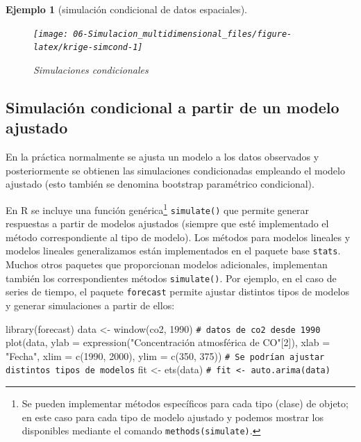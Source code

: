 \documentclass[
]{book}
\newenvironment{Shaded}{\begin{snugshade}}{\end{snugshade}}
\newcommand{\AttributeTok}[1]{\textcolor[rgb]{0.77,0.63,0.00}{#1}}
\newcommand{\CommentTok}[1]{\textcolor[rgb]{0.56,0.35,0.01}{\textit{#1}}}
\newcommand{\DecValTok}[1]{\textcolor[rgb]{0.00,0.00,0.81}{#1}}
\newcommand{\FunctionTok}[1]{\textcolor[rgb]{0.00,0.00,0.00}{#1}}
\newcommand{\NormalTok}[1]{#1}
\newcommand{\OtherTok}[1]{\textcolor[rgb]{0.56,0.35,0.01}{#1}}
\newcommand{\StringTok}[1]{\textcolor[rgb]{0.31,0.60,0.02}{#1}}
\theoremstyle{break}
\newtheorem{example}{Ejemplo}[chapter]
\theoremstyle{nonumberplain}
\renewcommand{\CommentTok}[1]{\textcolor[rgb]{0.41,0.41,0.41}{\texttt{#1}}}
\begin{document}
\begin{example}[simulación condicional de datos espaciales]
\begin{figure}[!htb]

{\centering \texttt{[image: 06-Simulacion\_multidimensional\_files/figure-latex/krige-simcond-1]} 

}

\caption{Simulaciones condicionales}\label{fig:krige-simcond}
\end{figure}

\end{example}

\hypertarget{simulaciuxf3n-condicional-a-partir-de-un-modelo-ajustado}{%
\subsection{Simulación condicional a partir de un modelo ajustado}\label{simulaciuxf3n-condicional-a-partir-de-un-modelo-ajustado}}

En la práctica normalmente se ajusta un modelo a los datos observados y posteriormente se obtienen las simulaciones condicionadas empleando el modelo ajustado
(esto también se denomina bootstrap paramétrico condicional).

En R se incluye una función genérica\footnote{Se pueden implementar métodos específicos para cada tipo (clase) de objeto; en este caso para cada tipo de modelo ajustado y podemos mostrar los disponibles mediante el comando \texttt{methods(simulate)}.} \texttt{simulate()} que permite generar respuestas a partir de modelos ajustados (siempre que esté implementado el método correspondiente al tipo de modelo).
Los métodos para modelos lineales y modelos lineales generalizamos están implementados en el paquete base \texttt{stats}.
Muchos otros paquetes que proporcionan modelos adicionales, implementan también los correspondientes métodos \texttt{simulate()}.
Por ejemplo, en el caso de series de tiempo, el paquete \texttt{forecast} permite ajustar distintos tipos de modelos y generar simulaciones a partir de ellos:



\begin{Shaded}
\begin{Highlighting}[]
\FunctionTok{library}\NormalTok{(forecast)}
\NormalTok{data }\OtherTok{\textless{}{-}} \FunctionTok{window}\NormalTok{(co2, }\DecValTok{1990}\NormalTok{) }\CommentTok{\# datos de co2 desde 1990}
\FunctionTok{plot}\NormalTok{(data, }\AttributeTok{ylab =} \FunctionTok{expression}\NormalTok{(}\StringTok{"Concentración atmosférica de CO"}\NormalTok{[}\DecValTok{2}\NormalTok{]),}
     \AttributeTok{xlab =} \StringTok{"Fecha"}\NormalTok{, }\AttributeTok{xlim =} \FunctionTok{c}\NormalTok{(}\DecValTok{1990}\NormalTok{, }\DecValTok{2000}\NormalTok{), }\AttributeTok{ylim =} \FunctionTok{c}\NormalTok{(}\DecValTok{350}\NormalTok{, }\DecValTok{375}\NormalTok{))}
\CommentTok{\# Se podrían ajustar distintos tipos de modelos}
\NormalTok{fit }\OtherTok{\textless{}{-}} \FunctionTok{ets}\NormalTok{(data)}
\CommentTok{\# fit \textless{}{-} auto.arima(data)}
\end{Highlighting}
\end{Shaded}
\end{document}
